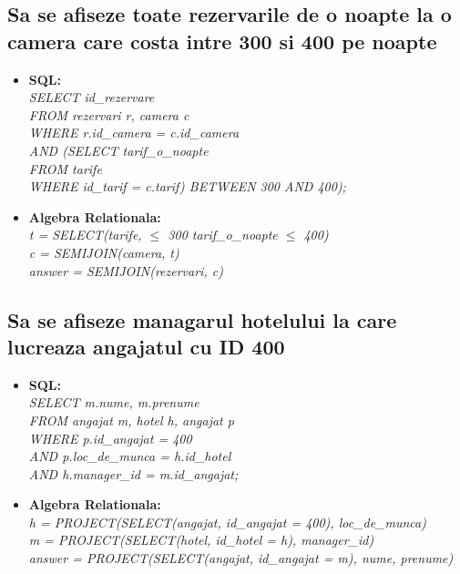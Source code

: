 \documentclass[a4paper,12pt]{article}
\begin{document}
	
	\subsection{Sa se afiseze toate rezervarile de o noapte la o camera care costa intre 300 si 400 pe noapte}
	
		\begin{itemize}
			\item \textbf{SQL:\\}
			\textit{SELECT id\_rezervare\\
				FROM rezervari r, camera c\\
				WHERE r.id\_camera = c.id\_camera\\
				        AND (SELECT tarif\_o\_noapte\\
				 	    FROM tarife\\
				 	    WHERE id\_tarif = c.tarif) BETWEEN 300 AND 400);}
			
			\item \textbf{Algebra Relationala:\\}
			\textit{t = SELECT(tarife, $\leq$ 300 tarif\_o\_noapte $\leq$ 400)\\
				c = SEMIJOIN(camera, t)\\
				answer = SEMIJOIN(rezervari, c)}
		\end{itemize}	
	
	
	\subsection{Sa se afiseze managarul hotelului la care lucreaza angajatul cu ID 400}
	
	\begin{itemize}
		\item \textbf{SQL:\\}
		\textit{SELECT m.nume, m.prenume\\
			FROM angajat m, hotel h, angajat p\\
			WHERE p.id\_angajat = 400\\
			AND p.loc\_de\_munca = h.id\_hotel\\
			AND h.manager\_id = m.id\_angajat;}
		
		\item \textbf{Algebra Relationala:\\}
		\textit{h = PROJECT(SELECT(angajat, id\_angajat = 400), loc\_de\_munca)\\
			m = PROJECT(SELECT(hotel, id\_hotel = h), manager\_id)\\
			answer = PROJECT(SELECT(angajat, id\_angajat = m), nume, prenume)}
	\end{itemize}	
	
	
\end{document}
